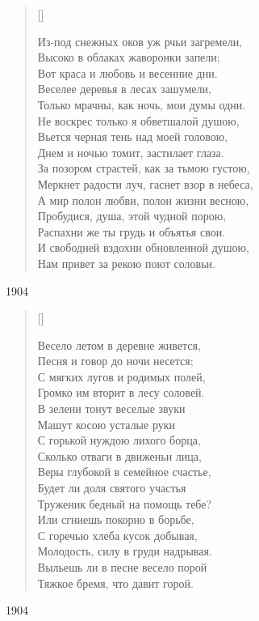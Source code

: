 \settowidth{\versewidth}{Из-под снежных оков уж ручьи загремели}
\begin{verse}[\versewidth]
\begin{patverse*}
Из-под снежных оков уж рчьи загремели,\\
Высоко в облаках жаворонки запели;\\
Вот краса и любовь и весенние дни.\\
Веселее деревья в лесах зашумели,\\
Только мрачны, как ночь, мои думы одни.\\
Не воскрес только я обветшалой душою,\\
Вьется черная тень над моей головою,\\
Днем и ночью томит, застилает глаза.\\
За позором страстей, как за тьмою густою,\\
Меркнет радости луч, гаснет взор в небеса,\\
А мир полон любви, полон жизни весною,\\
Пробудися, душа, этой чудной порою,\\
Распахни же ты грудь и объятья свои.\\
И свободней вздохни обновленной душою,\\
Нам привет за рекою поют соловьи.
\end{patverse*}
\end{verse}
1904


\settowidth{\versewidth}{Весело летом в деревне живется}
\begin{verse}[\versewidth]
\begin{patverse*}
Весело летом в деревне живется,\\
Песня и говор до ночи несется;\\
С мягких лугов и родимых полей,\\
Громко им вторит в лесу соловей.\\
В зелени тонут веселые звуки\\
Машут косою усталые руки\\
С горькой нуждою лихого борца,\\
Сколько отваги в движеньи лица,\\
Веры глубокой в семейное счастье,\\
Будет ли доля святого участья\\
Труженик бедный на помощь тебе?\\
Или сгниешь покорно в борьбе,\\
С горечью хлеба кусок добывая,\\
Молодость, силу в груди надрывая.\\
Выльешь ли в песне весело порой\\
Тяжкое бремя, что давит горой.
\end{patverse*}
\end{verse}
1904


